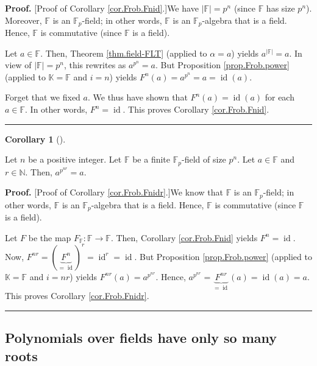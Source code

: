 \documentclass[numbers=enddot,12pt,final,onecolumn,notitlepage]{scrartcl}%
\theoremstyle{definition}
\newtheorem{coro}[theo]{Corollary}
\newenvironment{corollary}[1][]
{\begin{coro}[#1]\begin{leftbar}}
{\end{leftbar}\end{coro}}
\newenvironment{proof}[1][Proof]{\noindent\textbf{#1.} }{\ \rule{0.5em}{0.5em}}
\begin{document}
\begin{proof}
[Proof of Corollary \ref{cor.Frob.Fnid}.]We have $\left\vert \mathbb{F}%
\right\vert =p^{n}$ (since $\mathbb{F}$ has size $p^{n}$). Moreover,
$\mathbb{F}$ is an $\mathbb{F}_{p}$-field; in other words, $\mathbb{F}$ is an
$\mathbb{F}_{p}$-algebra that is a field. Hence, $\mathbb{F}$ is commutative
(since $\mathbb{F}$ is a field).

Let $a\in\mathbb{F}$. Then, Theorem \ref{thm.field-FLT} (applied to $\alpha
=a$) yields $a^{\left\vert \mathbb{F}\right\vert }=a$. In view of $\left\vert
\mathbb{F}\right\vert =p^{n}$, this rewrites as $a^{p^{n}}=a$. But Proposition
\ref{prop.Frob.power} (applied to $\mathbb{K}=\mathbb{F}$ and $i=n$) yields
$F^{n}\left(  a\right)  =a^{p^{n}}=a=\operatorname*{id}\left(  a\right)  $.

Forget that we fixed $a$. We thus have shown that $F^{n}\left(  a\right)
=\operatorname*{id}\left(  a\right)  $ for each $a\in\mathbb{F}$. In other
words, $F^{n}=\operatorname*{id}$. This proves Corollary \ref{cor.Frob.Fnid}.
\end{proof}

\begin{corollary}
\label{cor.Frob.Fnidr}Let $n$ be a positive integer. Let $\mathbb{F}$ be a
finite $\mathbb{F}_{p}$-field of size $p^{n}$. Let $a\in\mathbb{F}$ and
$r\in\mathbb{N}$. Then, $a^{p^{nr}}=a$.
\end{corollary}

\begin{proof}
[Proof of Corollary \ref{cor.Frob.Fnidr}.]We know that $\mathbb{F}$ is an
$\mathbb{F}_{p}$-field; in other words, $\mathbb{F}$ is an $\mathbb{F}_{p}%
$-algebra that is a field. Hence, $\mathbb{F}$ is commutative (since
$\mathbb{F}$ is a field).

Let $F$ be the map $F_{\mathbb{F}}:\mathbb{F}\rightarrow\mathbb{F}$. Then,
Corollary \ref{cor.Frob.Fnid} yields $F^{n}=\operatorname*{id}$. Now,
$F^{nr}=\left(  \underbrace{F^{n}}_{=\operatorname*{id}}\right)
^{r}=\operatorname*{id}\nolimits^{r}=\operatorname*{id}$. But Proposition
\ref{prop.Frob.power} (applied to $\mathbb{K}=\mathbb{F}$ and $i=nr$) yields
$F^{nr}\left(  a\right)  =a^{p^{nr}}$. Hence, $a^{p^{nr}}=\underbrace{F^{nr}%
}_{=\operatorname*{id}}\left(  a\right)  =\operatorname*{id}\left(  a\right)
=a$. This proves Corollary \ref{cor.Frob.Fnidr}.
\end{proof}

\subsection{Polynomials over fields have only so many roots}
\end{document}
